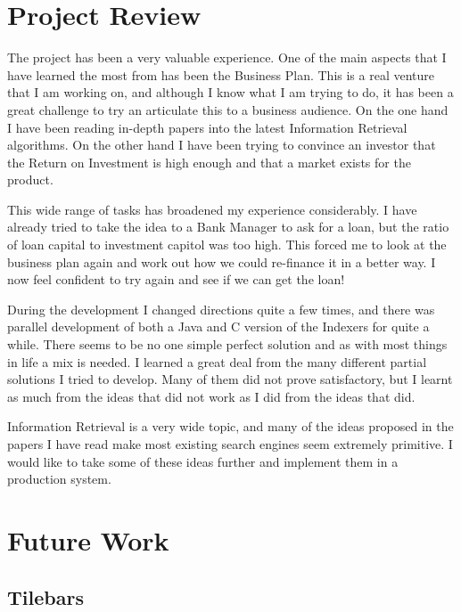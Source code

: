 
\chapter{Project Review}

The project has been a very valuable experience.  One of the main aspects that I have learned the most from has been the Business Plan.  This is a real venture that I am working on, and although I know what I am trying to do, it has been a great challenge to try an articulate this to a business audience.  On the one hand I have been reading in-depth papers into the latest Information Retrieval algorithms.  On the other hand I have been trying to convince an investor that the Return on Investment is high enough and that a market exists for the product.

This wide range of tasks has broadened my experience considerably.  I have already tried to take the idea to a Bank Manager to ask for a loan, but the ratio of loan capital to investment capitol was too high.  This forced me to look at the business plan again and work out how we could re-finance it in a better way.  I now feel confident to try again and see if we can get the loan!

During the development I changed directions quite a few times, and there was parallel development of both a Java and C version of the Indexers for quite a while.  There seems to be no one simple perfect solution and as with most things in life a mix is needed.  I learned a great deal from the many different partial solutions I tried to develop.  Many of them did not prove satisfactory, but I learnt as much from the ideas that did not work as I did from the ideas that did.

Information Retrieval is a very wide topic, and many of the ideas proposed in the papers I have read make most existing search engines seem extremely primitive.  I would like to take some of these ideas further and implement them in a production system. 

\chapter{Future Work}

\section{Tilebars}

